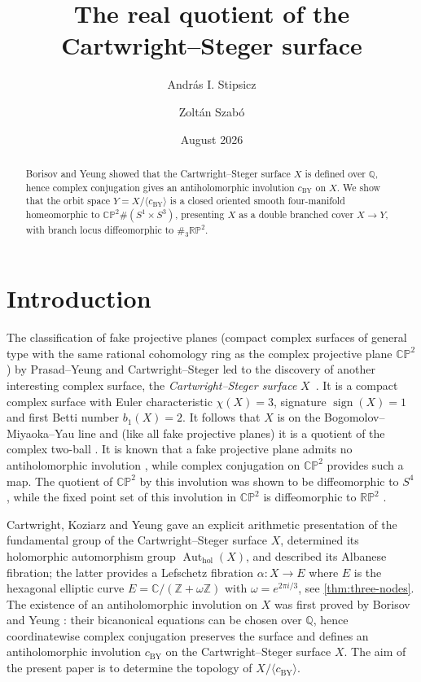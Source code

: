 \documentclass[11pt]{amsart}
\title{The real quotient of the Cartwright--Steger surface}
\author{Andr\'as I. Stipsicz}
\author{Zolt\'an Szab\'o}
\date{August 2026}
\theoremstyle{definition}
\theoremstyle{remark}
\newcommand{\Z}{\mathbb Z}
\newcommand{\C}{\mathbb C}
\newcommand{\CP}{\mathbb{CP}}
\newcommand{\RP}{\mathbb{RP}}
\newcommand{\sgn}{\operatorname{sign}}
\newcommand{\Aut}{\operatorname{Aut}}
\newcommand{\omegaE}{\omega}
\begin{document}
\begin{abstract}
Borisov and Yeung showed that the Cartwright--Steger surface $X$ is
defined over $\mathbb Q$, hence complex conjugation gives an
antiholomorphic involution $c_{\mathrm{BY}}$ on $X$.
We show that the orbit space
$Y=X/\langle c_{\mathrm{BY}}\rangle$ is a closed oriented smooth four-manifold
homeomorphic to $\CP^2\#(S^1\times S^3)$, presenting $X$ as a double
branched cover $X\to Y$, with branch locus diffeomorphic to $\#_3 {\RP}^2$.
\end{abstract}

\maketitle

\section{Introduction}

The classification of fake projective planes (compact complex surfaces
of general type with the same rational cohomology ring as the complex
projective plane $\CP^2$) by Prasad--Yeung and Cartwright--Steger
\cite{PY,CS} led to the discovery of another interesting complex
surface, the \emph{Cartwright--Steger surface} $X$~\cite{CS}. It is a compact
complex surface with Euler characteristic $\chi (X)=3$, signature
$\sgn (X)=1$ and first Betti number $b_1(X)=2$. It follows that $X$ is
on the Bogomolov--Miyaoka--Yau line and (like all fake projective
planes) it is a quotient of the complex two-ball \cite{Miyaoka,Yau}.
It is known that a fake projective plane admits no antiholomorphic
involution \cite[Theorem~5.1]{KharKul}, while complex conjugation on $\CP ^2$
provides such a map.  The quotient of $\CP ^2$ by this involution was
shown to be diffeomorphic to $S^4$, while the fixed point set of this
involution in $\CP ^2$ is
diffeomorphic to ${\RP} ^2$ \cite{Kuiper, Massey}.

Cartwright, Koziarz and Yeung \cite{CKY} gave an explicit arithmetic
presentation of the fundamental group of the Cartwright--Steger
surface $X$, determined its holomorphic automorphism group
$\Aut_{\mathrm{hol}}(X)$, and described its Albanese fibration; the
latter provides a Lefschetz fibration $\alpha \colon X\to E$ where $E$
is the hexagonal elliptic curve $E=\C/(\Z+\omegaE\Z)$ with
$\omegaE=e^{2\pi i/3}$, see \cref{thm:three-nodes}. The existence of
an antiholomorphic involution on $X$ was first proved by Borisov and
Yeung \cite[Introduction and Remark~5.1]{BY}: their bicanonical
equations can be chosen over $\mathbb Q$, hence coordinatewise complex
conjugation preserves the surface and defines an antiholomorphic
involution $c_{\mathrm{BY}}$ on the Cartwright--Steger surface
$X$. The aim of the present paper is to determine the topology of
$X/\langle c_{\mathrm{BY}}\rangle $.
\end{document}
